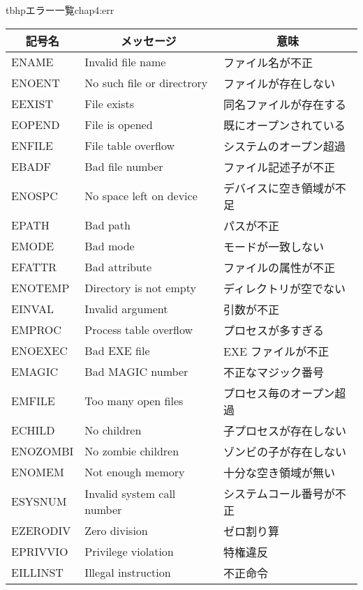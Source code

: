 \begin{mytable}{tbhp}{エラー一覧}{chap4:err}
\begin{tabular}{l|l|l}
\multicolumn{1}{c|}{記号名}
 & \multicolumn{1}{c|}{メッセージ}
 & \multicolumn{1}{c}{意味} \\\hline
ENAME     & Invalid file name           & ファイル名が不正 \\
ENOENT    & No such file or directrory  & ファイルが存在しない \\
EEXIST    & File exists                 & 同名ファイルが存在する \\
EOPEND    & File is opened              & 既にオープンされている \\
ENFILE    & File table overflow         & システムのオープン超過 \\
EBADF     & Bad file number             & ファイル記述子が不正 \\
ENOSPC    & No space left on device     & デバイスに空き領域が不足 \\
EPATH     & Bad path                    & パスが不正 \\
EMODE     & Bad mode                    & モードが一致しない \\
EFATTR    & Bad attribute               & ファイルの属性が不正 \\
ENOTEMP   & Directory is not empty      & ディレクトリが空でない \\
EINVAL    & Invalid argument            & 引数が不正 \\
EMPROC    & Process table overflow      & プロセスが多すぎる \\
ENOEXEC   & Bad EXE file                & EXE ファイルが不正 \\
EMAGIC    & Bad MAGIC number            & 不正なマジック番号 \\
EMFILE    & Too many open files         & プロセス毎のオープン超過 \\
ECHILD    & No children                 & 子プロセスが存在しない \\
ENOZOMBI  & No zombie children          & ゾンビの子が存在しない \\
ENOMEM    & Not enough memory           & 十分な空き領域が無い \\
ESYSNUM   & Invalid system call number  & システムコール番号が不正 \\
EZERODIV  & Zero division               & ゼロ割り算 \\
EPRIVVIO  & Privilege violation         & 特権違反 \\
EILLINST  & Illegal instruction         & 不正命令 \\

\end{tabular}
\end{mytable}
